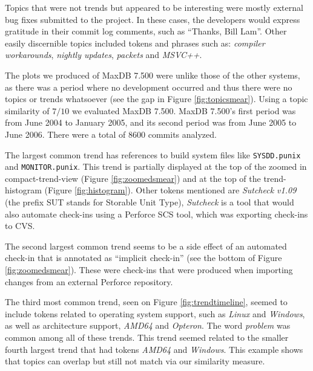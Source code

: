 \documentclass[times, 10pt,twocolumn]{article}
\newcommand{\shrinkit}{\vspace*{-.3em}}
\begin{document}
Topics that were not trends but appeared to be interesting were mostly
external bug fixes submitted to the project.  In these cases, the
developers would express gratitude in their commit log comments, such
as ``Thanks, Bill Lam''.  Other easily discernible topics included
tokens and phrases such as: \emph{compiler workarounds}, \emph{nightly
  updates}, \emph{packets} and \emph{MSVC++}.


\shrinkit
{}
\shrinkit

\label{sec:maxdb}





The plots we produced of MaxDB 7.500 were unlike those of the other
systems, as there was a period where no development occurred and thus
there were no topics or trends whatsoever (see the gap in Figure
\ref{fig:topicsmear}). Using a topic similarity of $7/10$ we evaluated
MaxDB 7.500. MaxDB 7.500's first period was from June 2004 to January
2005, and its second period was from June 2005 to June 2006. There
were a total of $8 600$ commits analyzed.


The largest common trend has references to build system files like
\texttt{SYSDD.punix} and \texttt{MONITOR.punix}.  This trend is
partially displayed at the top of the zoomed in compact-trend-view
(Figure \ref{fig:zoomedsmear}) and at the top of the trend-histogram
(Figure \ref{fig:histogram}).  Other tokens mentioned are
\emph{Sutcheck v1.09} (the prefix SUT stands for Storable Unit Type),
\emph{Sutcheck} is a tool that would also automate check-ins using a Perforce SCS
tool, which was exporting check-ins to CVS.

The second largest common trend seems to be a side effect of an
automated check-in that is annotated as ``implicit check-in'' (see
the bottom of Figure \ref{fig:zoomedsmear}). These were check-ins that
were produced when importing changes from an external Perforce
repository.

The third most common trend, seen on Figure \ref{fig:trendtimeline},
seemed to include tokens related to operating system support, such as
\emph{Linux} and \emph{Windows}, as well as architecture support, \emph{AMD64} and
\emph{Opteron}. The word \emph{problem} was common among all of these
trends. This trend seemed related to the smaller fourth largest trend
that had tokens \emph{AMD64} and \emph{Windows}. This example shows that
topics can overlap but still not match via our similarity measure.
\end{document}
